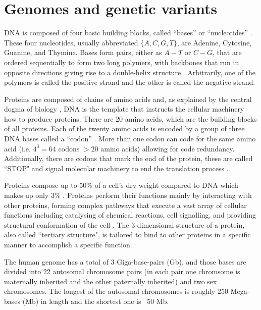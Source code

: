 \section{Genomes and genetic variants \label{sec:introRef}}

DNA is composed of four basic building blocks, called ``bases'' or ``nucleotides'' \cite{alberts1995molecular}. 
These four nucleotides, usually abbreviated $\{A, C, G, T\}$, are Adenine, Cytosine, Guanine, and Thymine. 
Bases form pairs, either as $A-T$ or $C-G$, that are ordered sequentially to form two long polymers, with backbones that run in opposite directions giving rise to a double-helix structure \cite{watson1953molecular}. 
Arbitrarily, one of the polymers is called the positive strand and the other is called the negative strand. 

Proteins are composed of chains of amino acids and, as explained by the central dogma of biology \cite{alberts1995molecular},  DNA is the template that instructs the cellular machinery how to produce proteins. 
There are 20 amino acids, which are the building blocks of all proteins. Each of the twenty amino acids is encoded by a group of three DNA bases called a ``codon'' \cite{crick1961general}. 
More than one codon can code for the same amino acid (i.e. $4^3=64$ codons $ > 20 $ amino acids) allowing for code redundancy. 
Additionally, there are codons that mark the end of the protein, these are called ``STOP" and signal molecular machinery to end the translation process \cite{brenner1965genetic}.

Proteins compose up to 50\% of a cell's dry weight compared to DNA which makes up only 3\% \cite{alberts1995molecular}. 
Proteins perform their functions mainly by interacting with other proteins, forming complex pathways that execute a vast array of cellular functions including catalysing of chemical reactions, cell signalling, and providing structural conformation of the cell \cite{alberts1995molecular}. 
The 3-dimensional structure of a protein, also called ``tertiary structure", is tailored to bind to other proteins in a specific manner to accomplish a specific function. 

The human genome has a total of 3 Giga-base-pairs (Gb), and those bases are divided into 22 autosomal chromosome pairs (in each pair one chromsome is maternally inherited and the other paternally inherited) and two sex chromosomes. 
The longest of the autosomal chromosomes is roughly 250 Mega-bases (Mb) in length and the shortest one is ~50 Mb.

